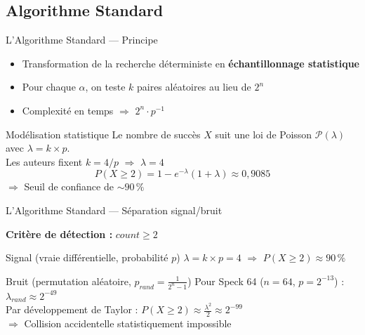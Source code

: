 \documentclass[10pt]{beamer}
\begin{document}
\subsection{Algorithme Standard}

\begin{frame}{L'Algorithme Standard — Principe} %
    \begin{itemize}
        \item Transformation de la recherche déterministe en \textbf{échantillonnage statistique}
        \item Pour chaque $\alpha$, on teste $k$ paires aléatoires au lieu de $2^n$
        \item Complexité en temps $\Rightarrow$ $2^n \cdot p^{-1}$
    \end{itemize}
 
    \begin{block}{Modélisation statistique}
        Le nombre de succès $X$ suit une loi de Poisson $\mathcal{P}(\lambda)$ avec $\lambda = k \times p$. \\[0.5em]
        Les auteurs fixent $k = 4/p$ $\Rightarrow$ $\lambda = 4$ \\[0.5em]
        \begin{equation*}
            P(X \ge 2) = 1 - e^{-\lambda}(1+\lambda) \approx 0{,}9085
        \end{equation*}
        $\Rightarrow$ Seuil de confiance de $\sim 90\,\%$
    \end{block}
\end{frame}
 
\begin{frame}{L'Algorithme Standard — Séparation signal/bruit} %
 
    \textbf{Critère de détection :} $count \ge 2$
 
    \begin{exampleblock}{Signal (vraie différentielle, probabilité $p$)}
        $\lambda = k \times p = 4$ $\Rightarrow$ $P(X \ge 2) \approx 90\,\%$
    \end{exampleblock}
 
    \begin{alertblock}{Bruit (permutation aléatoire, $p_{rand} = \frac{1}{2^n - 1}$)}
        Pour Speck 64 ($n=64$, $p=2^{-13}$) : $\lambda_{rand} \approx 2^{-49}$ \\[0.5em]
        Par développement de Taylor : $P(X \ge 2) \approx \frac{\lambda^2}{2} \approx 2^{-99}$ \\[0.5em]
        $\Rightarrow$ Collision accidentelle statistiquement impossible
    \end{alertblock}
\end{frame}
 
\end{document}
